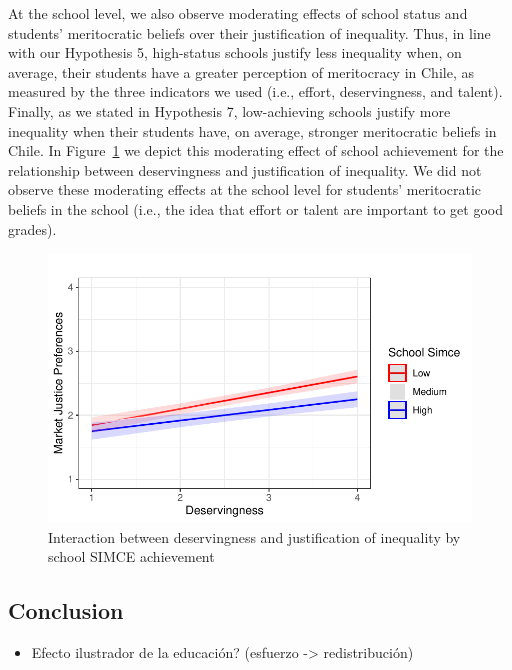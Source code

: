 \documentclass[
  letterpaper,
  DIV=11,
  numbers=noendperiod]{scrartcl}
\providecommand{\tightlist}{%
  \setlength{\itemsep}{0pt}\setlength{\parskip}{0pt}}\usepackage{longtable,booktabs,array}
\begin{document}
At the school level, we also observe moderating effects of school status
and students' meritocratic beliefs over their justification of
inequality. Thus, in line with our Hypothesis 5, high-status schools
justify less inequality when, on average, their students have a greater
perception of meritocracy in Chile, as measured by the three indicators
we used (i.e., effort, deservingness, and talent). Finally, as we stated
in Hypothesis 7, low-achieving schools justify more inequality when
their students have, on average, stronger meritocratic beliefs in Chile.
In Figure~\ref{fig-interaction} we depict this moderating effect of
school achievement for the relationship between deservingness and
justification of inequality. We did not observe these moderating effects
at the school level for students' meritocratic beliefs in the school
(i.e., the idea that effort or talent are important to get good grades).

\begin{figure}

{\centering \includegraphics{paper_files/figure-pdf/fig-interaction-1.pdf}

}

\caption{\label{fig-interaction}Interaction between deservingness and
justification of inequality by school SIMCE achievement}

\end{figure}

\hypertarget{conclusion}{%
\subsection{Conclusion}\label{conclusion}}

\begin{itemize}
\tightlist
\item
  Efecto ilustrador de la educación? (esfuerzo -\textgreater{}
  redistribución)
\end{itemize}
\end{document}
